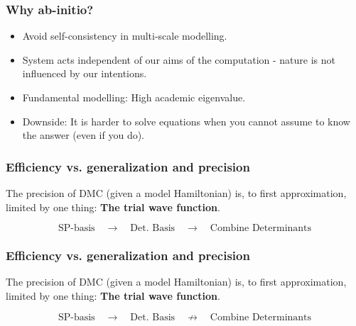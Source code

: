 \documentclass{beamer}
\begin{document}
\begin{frame}\frametitle{Why ab-initio?}

\begin{itemize}
 \item Avoid self-consistency in multi-scale modelling.
 \pause\item System acts independent of our aims of the computation - nature is not influenced by our intentions.
 \pause\item Fundamental modelling: High academic eigenvalue.
 \pause\item Downside: It is harder to solve equations when you cannot assume to know the answer (even if you do).
\end{itemize}

\end{frame}

\begin{frame}\frametitle{Efficiency vs. generalization and precision}

The precision of DMC (given a model Hamiltonian) is, to first approximation, limited by one thing: \textbf{The trial wave function}.

\pause
\vspace{0.5cm}

\begin{equation*}
 \text{SP-basis} \quad \to \quad \text{Det. Basis} \quad \to \quad \text{Combine Determinants}
\end{equation*}


\end{frame}

\begin{frame}\frametitle{Efficiency vs. generalization and precision}

The precision of DMC (given a model Hamiltonian) is, to first approximation, limited by one thing: \textbf{The trial wave function}.

\vspace{0.5cm}
\begin{equation*}
 \text{SP-basis} \quad \to \quad \text{Det. Basis} \quad \not\to \quad \text{Combine Determinants}
\end{equation*}


\end{frame}

\begin{frame}
 
\end{frame}
\end{document}
